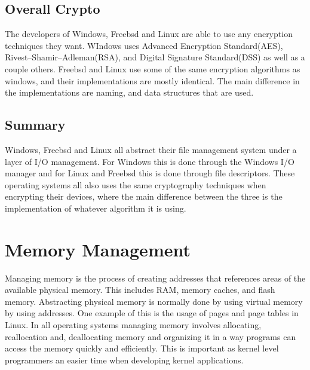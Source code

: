 \documentclass[onecolumn, draftclsnofoot, 10pt, titlepage, compsoc]{IEEEtran}
\begin{document}
\subsection{Overall Crypto}
The developers of Windows, Freebsd and Linux are able to use any encryption techniques they want. WIndows uses Advanced Encryption Standard(AES), Rivest–Shamir–Adleman(RSA), and Digital Signature Standard(DSS) as well as a couple others. Freebsd and Linux use some of the same encryption algorithms as windows, and their implementations are mostly identical. The main difference in the implementations are naming, and data structures that are used.

\subsection{Summary}
Windows, Freebsd and Linux all abstract their file management system under a layer of I/O management. For Windows this is done through the Windows I/O manager and for Linux and Freebsd this is done through file descriptors. These operating systems all also uses the same cryptography techniques when encrypting their devices, where the main difference between the three is the implementation of whatever algorithm it is using.

\section{Memory Management}
Managing memory is the process of creating addresses that references areas of the available physical memory. This includes RAM, memory caches, and flash memory. Abstracting physical memory is normally done by using virtual memory by using addresses. One example of this is the usage of pages and page tables in Linux. In all operating systems managing memory involves allocating, reallocation and, deallocating memory and organizing it in a way programs can access the memory quickly and efficiently. This is important as kernel level programmers an easier time when developing kernel applications.
\end{document}
